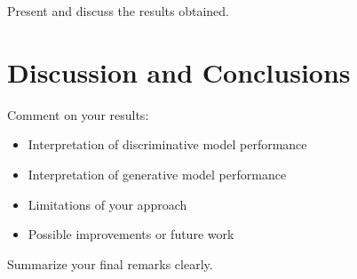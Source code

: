 \documentclass[a4paper,11pt]{article}
\begin{document}
Present and discuss the results obtained.

\section{Discussion and Conclusions}
Comment on your results:
\begin{itemize}
    \item Interpretation of discriminative model performance
    \item Interpretation of generative model performance
    \item Limitations of your approach
    \item Possible improvements or future work
\end{itemize}

Summarize your final remarks clearly.



\end{document}
